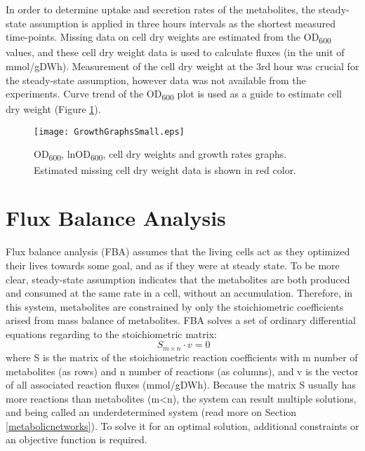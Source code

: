 In order to determine uptake and secretion rates of the metabolites, the steady-state assumption is applied in three hours intervals as the shortest measured time-points. Missing data on cell dry weights are estimated from the OD\textsubscript{600} values, and these cell dry weight data is used to calculate fluxes (in the unit of mmol/gDWh). Measurement of the cell dry weight at the 3rd hour was crucial for the steady-state assumption, however data was not available from the experiments. Curve trend of the OD\textsubscript{600} plot is used as a guide to estimate cell dry weight (Figure \ref{fig:GrowthGraphs}).
\begin{figure}[H]
  \begin{center}
  \texttt{[image: GrowthGraphsSmall.eps]}
  \end{center}
  \caption[OD\textsubscript{600}, lnOD\textsubscript{600}, cell dry weights and growth rates]{OD\textsubscript{600}, lnOD\textsubscript{600}, cell dry weights and growth rates graphs. Estimated missing cell dry weight data is shown in red color.}
\label{fig:GrowthGraphs}
\end{figure}



\section{Flux Balance Analysis}
Flux balance analysis (FBA) assumes that the living cells act as they optimized their lives towards some goal, and as if they were at steady state. To be more clear, steady-state assumption indicates that the metabolites are both produced and consumed at the same rate in a cell, without an accumulation. Therefore, in this system, metabolites are constrained by only the stoichiometric coefficients arised from mass balance of metabolites. FBA solves a set of ordinary differential equations regarding to the stoichiometric matrix:
\begin{equation}
 \ S_{m \times n} \cdot v=0
\end{equation}
\noindent where S is the matrix of the stoichiometric reaction coefficients with m number of metabolites (as rows) and n number of reactions (as columns), and v is the vector of all associated reaction fluxes (mmol/gDWh). Because the matrix S usually has more reactions than metabolites (m<n), the system can result multiple solutions, and being called an underdetermined system (read more on Section \ref{metabolicnetworks}). To solve it for an optimal solution, additional constraints or an objective function is required.

